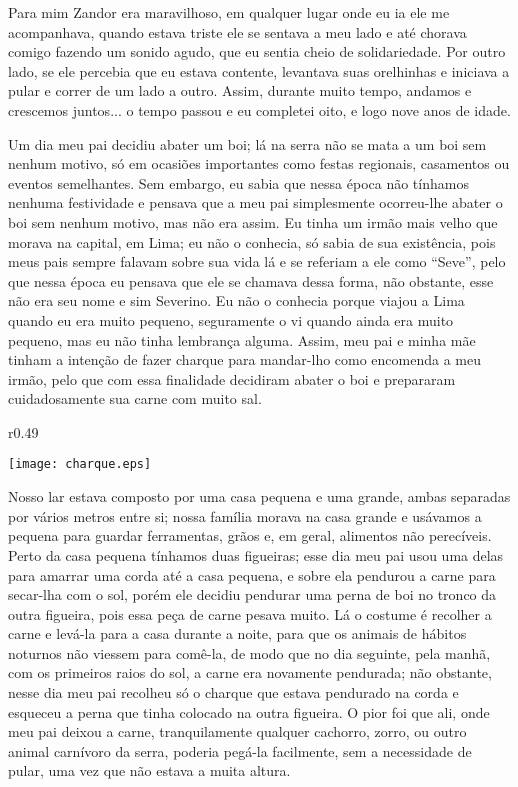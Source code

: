 Para mim Zandor era maravilhoso, em qualquer lugar onde eu ia ele me acompanhava, quando estava triste ele se sentava a meu lado e até chorava comigo fazendo um sonido agudo, que eu sentia cheio de solidariedade. 
Por outro lado, se ele percebia que eu estava contente, levantava suas orelhinhas e iniciava a pular e correr de um lado a outro. Assim, durante muito tempo, andamos e crescemos juntos... o tempo passou e eu completei oito, e logo nove anos de idade.

Um dia meu pai decidiu abater um boi; lá na serra não se mata a um boi sem nenhum motivo, só em ocasiões importantes como festas regionais, casamentos ou eventos semelhantes. Sem embargo, eu sabia que nessa época não tínhamos nenhuma festividade e pensava que a meu pai simplesmente ocorreu-lhe abater o boi sem nenhum motivo, mas não era assim. 
Eu tinha um irmão mais velho que morava na capital, em Lima; eu não o conhecia, só sabia de sua existência, pois meus pais sempre falavam sobre sua vida lá e se referiam a ele como ``Seve'', pelo que nessa época eu pensava que ele se chamava dessa forma, não obstante, esse não era seu nome e sim Severino. Eu não o conhecia porque viajou a Lima quando eu era muito pequeno, seguramente o vi quando ainda era muito pequeno, mas eu não tinha lembrança alguma. 
Assim, meu pai e minha mãe tinham a intenção de fazer charque para mandar-lho como encomenda a meu irmão, pelo que com essa finalidade decidiram abater o boi e prepararam cuidadosamente sua carne com muito sal.

\ifdefined\EnableIncludeImages
\begin{wrapfigure}{r}{0.49\textwidth}
  \begin{center}
  \vspace{-20pt}
    \texttt{[image: charque.eps]}
  \end{center}
  \vspace{-20pt}
\end{wrapfigure}
\fi
Nosso lar estava composto por uma casa pequena e uma grande, ambas separadas por vários metros entre si; nossa família morava na casa grande e usávamos a pequena para guardar ferramentas, grãos e, em geral, alimentos não perecíveis. Perto da casa pequena tínhamos duas figueiras; esse dia meu pai usou uma delas para amarrar uma corda até a casa pequena, e sobre ela pendurou a carne para secar-lha com o sol, porém ele decidiu pendurar uma perna de boi no tronco da outra figueira, pois essa peça de carne pesava muito.
Lá o costume é recolher a carne e levá-la para a casa durante a noite, para que os animais de hábitos noturnos não viessem para comê-la, de modo que no dia seguinte, pela manhã, com os primeiros raios do sol, a carne era novamente pendurada; não obstante, nesse dia meu pai recolheu só o charque que estava pendurado na corda e esqueceu a perna que tinha colocado na outra figueira. 
O pior foi que ali, onde meu pai deixou a carne, tranquilamente qualquer cachorro, zorro, ou outro animal carnívoro da serra, poderia pegá-la facilmente, sem a necessidade de pular, uma vez que não estava a muita altura.

